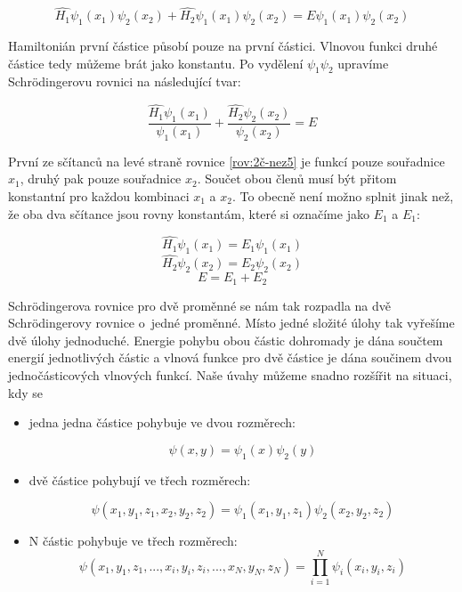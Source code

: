 \begin{equation}
\hat{H_{1}}\psi_{1}(x_{1})\psi_{2}(x_{2})+\hat{H_{2}}\psi_{1}(x_{1})\psi_{2}(x_{2})=E\psi_{1}(x_{1})\psi_{2}(x_{2})
\label{rov:2č-nez44}
\end{equation}


Hamiltonián první částice působí pouze na první částici. Vlnovou funkci druhé částice tedy můžeme brát jako konstantu. Po vydělení $\psi_{1}\psi_{2}$ upravíme Schr\"odingerovu rovnici na následující tvar: 

\begin{equation}
\frac{\hat{H_{1}}\psi_{1}(x_{1})}{\psi_{1}(x_{1})}+\frac{\hat{H_{2}}\psi_{2}(x_{2})}{\psi_{2}(x_{2})}=E
\label{rov:2č-nez5}
\end{equation}

První ze sčítanců na levé straně rovnice \ref{rov:2č-nez5} je funkcí pouze souřadnice $x_{1}$, druhý pak pouze souřadnice $x_{2}$. Součet obou členů musí být přitom konstantní pro každou kombinaci  $x_{1}$ a $x_{2}$. To obecně není možno splnit jinak než, že oba dva sčítance jsou rovny konstantám, které si označíme jako $E_{1}$ a $E_{1}$:

\begin{equation}
\hat{H_{1}}\psi_{1}(x_{1})=E_{1}\psi_{1}(x_{1})
\label{rov:2č-nez6}
\end{equation}
\begin{equation}
\hat{H_{2}}\psi_{2}(x_{2})=E_{2}\psi_{2}(x_{2})
\label{rov:2č-nez7}
\end{equation}
\begin{equation}
E=E_{1}+E_{2}
\label{rov:2č-nez8}
\end{equation}

Schr\"odingerova rovnice pro dvě proměnné se nám tak rozpadla na dvě Schr\"odingerovy rovnice o~jedné proměnné. Místo jedné složité úlohy tak vyřešíme dvě úlohy jednoduché. Energie pohybu obou částic dohromady je dána součtem energií jednotlivých částic a vlnová funkce pro dvě částice je dána součinem dvou jednočásticových vlnových funkcí. Naše úvahy můžeme snadno rozšířit na situaci, kdy se
\begin{itemize}
\item jedna jedna částice pohybuje ve dvou rozměrech: 

\begin{equation}
\psi(x,y)=\psi_{1}(x)\psi_{2}(y)
\label{rov:2č-nez9}
\end{equation}

\item dvě částice pohybují ve třech rozměrech:

\begin{equation}
\psi(x_{1},y_{1},z_{1},x_{2},y_{2},z_{2})=\psi_{1}(x_{1},y_{1},z_{1})\psi_{2}(x_{2},y_{2},z_{2})
\label{rov:2č-nez4}
\end{equation}

\item N částic pohybuje ve třech rozměrech:
\begin{equation}
\psi(x_{1},y_{1},z_{1},...,x_{i},y_{i},z_{i},...,x_{N},y_{N},z_{N})=
\prod_{i=1}^N\psi_{i}(x_{i},y_{i},z_{i})
\label{rov:2č-Nčástic}
\end{equation}

\end{itemize}

